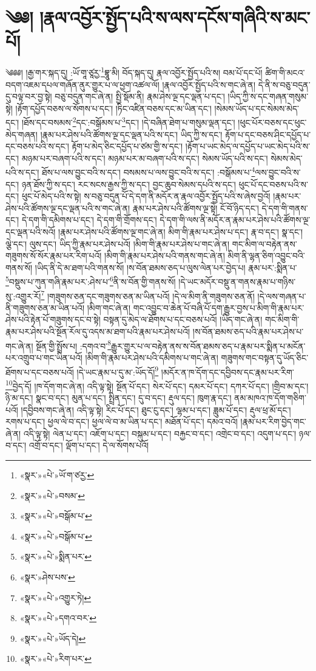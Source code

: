 \chapter{༄༅། །རྣལ་འབྱོར་སྤྱོད་པའི་ས་ལས་དངོས་གཞིའི་ས་མང་པོ།}༄༅༅། །རྒྱ་གར་སྐད་དུ། :ཡོ་གཱ་ཙཱརྱ་\footnote{«སྣར་»«པེ་»ཡོ་ག་ཙརྱ་}བྷཱུ་མི། བོད་སྐད་དུ། རྣལ་འབྱོར་སྤྱོད་པའི་ས། བམ་པོ་དང་པོ། ཚིག་གི་མངའ་བདག་འཇམ་དཔལ་གཞོན་ནུར་གྱུར་པ་ལ་ཕྱག་འཚལ་ལོ། །རྣལ་འབྱོར་སྤྱོད་པའི་ས་གང་ཞེ་ན། དེ་ནི་ས་བཅུ་བདུན་དུ་བལྟ་བར་བྱ་སྟེ། བཅུ་བདུན་གང་ཞེ་ན། སྤྱི་སྡོམ་ནི། རྣམ་ཤེས་ལྔ་དང་ལྡན་པ་དང་། །ཡིད་ཀྱི་ས་དང་གཞན་གསུམ་སྟེ། །རྟོག་དཔྱོད་བཅས་ལ་སོགས་པ་དང་། །ཏིང་འཛིན་བཅས་དང་མ་ཡིན་དང་། །སེམས་ཡོད་པ་དང་སེམས་མེད་དང་། །ཐོས་དང་བསམས་\footnote{«སྣར་»«པེ་»བསམ་}དང་:བསྒོམས་པ་\footnote{«སྣར་»«པེ་»བསྒོམ་པ་}དང་། །དེ་བཞིན་ཐེག་པ་གསུམ་ལྡན་དང་། །ཕུང་པོར་བཅས་དང་ཕུང་མེད་གཞན། །རྣམ་པར་ཤེས་པའི་ཚོགས་ལྔ་དང་ལྡན་པའི་ས་དང་། ཡིད་ཀྱི་ས་དང་། རྟོག་པ་དང་བཅས་ཤིང་དཔྱོད་པ་དང་བཅས་པའི་ས་དང་། རྟོག་པ་མེད་ཅིང་དཔྱོད་པ་ཙམ་གྱི་ས་དང་། །རྟོག་པ་ཡང་མེད་ལ་དཔྱོད་པ་ཡང་མེད་པའི་ས་དང་། མཉམ་པར་བཞག་པའི་ས་དང་། མཉམ་པར་མ་བཞག་པའི་ས་དང་། སེམས་ཡོད་པའི་ས་དང་། སེམས་མེད་པའི་ས་དང་། ཐོས་པ་ལས་བྱུང་བའི་ས་དང་། བསམས་པ་ལས་བྱུང་བའི་ས་དང་། :བསྒོམས་པ་\footnote{«སྣར་»«པེ་»བསྒོམ་པ་}ལས་བྱུང་བའི་ས་དང་། ཉན་ཐོས་ཀྱི་ས་དང་། རང་སངས་རྒྱས་ཀྱི་ས་དང་། བྱང་ཆུབ་སེམས་དཔའི་ས་དང་། ཕུང་པོ་དང་བཅས་པའི་ས་དང་། ཕུང་པོ་མེད་པའི་ས་སྟེ། ས་བཅུ་བདུན་པོ་དེ་དག་ནི་མདོར་ན་རྣལ་འབྱོར་སྤྱོད་པའི་ས་ཞེས་བྱའོ། །རྣམ་པར་ཤེས་པའི་ཚོགས་ལྔ་དང་ལྡན་པའི་ས་གང་ཞེ་ན། རྣམ་པར་ཤེས་པའི་ཚོགས་ལྔ་སྟེ། ངོ་བོ་ཉིད་དང་། དེ་དག་གི་གནས་དང་། དེ་དག་གི་དམིགས་པ་དང་། དེ་དག་གི་གྲོགས་དང་། དེ་དག་གི་ལས་ནི་མདོར་ན་རྣམ་པར་ཤེས་པའི་ཚོགས་ལྔ་དང་ལྡན་པའི་སའོ། །རྣམ་པར་ཤེས་པའི་ཚོགས་ལྔ་གང་ཞེ་ན། མིག་གི་རྣམ་པར་ཤེས་པ་དང་། རྣ་བ་དང་། སྣ་དང་། ལྕེ་དང་། ལུས་དང་། ཡིད་ཀྱི་རྣམ་པར་ཤེས་པའོ། །མིག་གི་རྣམ་པར་ཤེས་པ་གང་ཞེ་ན། གང་མིག་ལ་བརྟེན་ནས་གཟུགས་སོ་སོར་རྣམ་པར་རིག་པའོ། །མིག་གི་རྣམ་པར་ཤེས་པའི་གནས་གང་ཞེ་ན། མིག་ནི་ལྷན་ཅིག་འབྱུང་བའི་གནས་སོ། །ཡིད་ནི་དེ་མ་ཐག་པའི་གནས་སོ། །ས་བོན་ཐམས་ཅད་པ་ལུས་ལེན་པར་བྱེད་པ། རྣམ་པར་:སྨིན་པ་\footnote{«སྣར་»«པེ་»སྨིན་པར་}བསྡུས་པ་ཀུན་གཞི་རྣམ་པར་:ཤེས་པ་\footnote{«སྣར་»ཤེས་པས་}ནི་ས་བོན་གྱི་གནས་སོ། །དེ་ཡང་མདོར་བསྡུ་ན་གནས་རྣམ་པ་གཉིས་སུ་:འགྱུར་རོ།\footnote{«སྣར་»«པེ་»འགྱུར་ཏེ།} །གཟུགས་ཅན་དང་གཟུགས་ཅན་མ་ཡིན་པའོ། །དེ་ལ་མིག་ནི་གཟུགས་ཅན་ནོ། །དེ་ལས་གཞན་པ་ནི་གཟུགས་ཅན་མ་ཡིན་པའོ། །མིག་གང་ཞེ་ན། གང་འབྱུང་བ་ཆེན་པོ་བཞི་པོ་དག་རྒྱུར་བྱས་པ་མིག་གི་རྣམ་པར་ཤེས་པའི་རྟེན་པོ་གཟུགས་དང་བ་སྟེ། བསྟན་དུ་མེད་ལ་ཐོགས་པ་དང་བཅས་པའོ། །ཡིད་གང་ཞེ་ན། གང་མིག་གི་རྣམ་པར་ཤེས་པའི་སྔོན་རོལ་དུ་འདས་མ་ཐག་པའི་རྣམ་པར་ཤེས་པའོ། །ས་བོན་ཐམས་ཅད་པའི་རྣམ་པར་ཤེས་པ་གང་ཞེ་ན། སྔོན་གྱི་སྤྲོས་པ། :དགའ་བ་\footnote{«སྣར་»«པེ་»དགའ་བར་}རྒྱུར་གྱུར་པ་ལ་བརྟེན་ནས་ས་བོན་ཐམས་ཅད་པ་རྣམ་པར་སྨིན་པ་མངོན་པར་འགྲུབ་པ་གང་ཡིན་པའོ། །མིག་གི་རྣམ་པར་ཤེས་པའི་དམིགས་པ་གང་ཞེ་ན། གཟུགས་གང་བསྟན་དུ་ཡོད་ཅིང་ཐོགས་པ་དང་བཅས་པའོ། །དེ་ཡང་རྣམ་པ་དུ་མ་:ཡོད་དོ།\footnote{«སྣར་»«པེ་»ཡོད་དེ།} །མདོར་ན་ཁ་དོག་དང་དབྱིབས་དང་རྣམ་པར་རིག་\footnote{«སྣར་»«པེ་»རིག་པར་}བྱེད་དོ། །ཁ་དོག་གང་ཞེ་ན། འདི་ལྟ་སྟེ། སྔོན་པོ་དང་། སེར་པོ་དང་། དམར་པོ་དང་། དཀར་པོ་དང་། །གྲིབ་མ་དང་། ཉི་མ་དང་། སྣང་བ་དང་། མུན་པ་དང་། སྤྲིན་དང་། དུ་བ་དང་། རྡུལ་དང་། ཁུག་རྣ་དང་། ནམ་མཁའ་ཁ་དོག་གཅིག་པའོ། །དབྱིབས་གང་ཞེ་ན། འདི་ལྟ་སྟེ། རིང་པོ་དང་། ཐུང་ངུ་དང་། ལྷམ་པ་དང་། ཟླུམ་པོ་དང་། རྡུལ་ཕྲ་མོ་དང་། རགས་པ་དང་། ཕྱལ་ལེ་བ་དང་། ཕྱལ་ལེ་བ་མ་ཡིན་པ་དང་། མཐོན་པོ་དང་། དམའ་བའོ། །རྣམ་པར་རིག་བྱེད་གང་ཞེ་ན། འདི་ལྟ་སྟེ། ལེན་པ་དང་། འཇོག་པ་དང་། བསྐུམ་པ་དང་། བརྐྱང་བ་དང་། འགྲེང་བ་དང་། འདུག་པ་དང་། ཉལ་བ་དང་། འགྲོ་བ་དང་། ལྡོག་པ་དང་། དེ་ལ་སོགས་པའོ། 